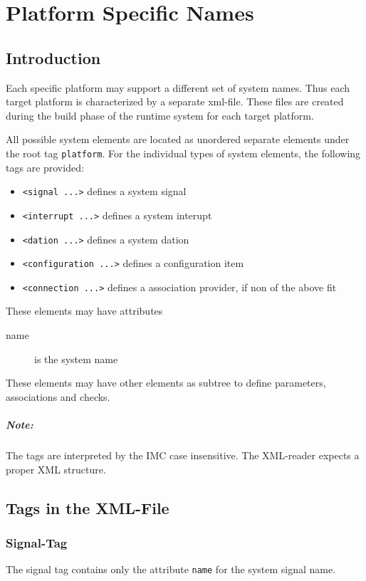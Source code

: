 \chapter{Platform Specific Names}

\section{Introduction}
Each specific platform may support a different set of system names.
Thus each target platform is characterized by a separate xml-file.
These files are created during the build phase of the runtime system
for each target platform.

All possible system elements are located as unordered separate 
elements under the root tag \verb|platform|.
For the individual types of system elements, the following tags are
provided:
\begin{itemize}
\item \verb|<signal ...>| defines a system signal
\item \verb|<interrupt ...>| defines a system interupt
\item \verb|<dation ...>| defines a system dation
\item \verb|<configuration ...>| defines a configuration item
\item \verb|<connection ...>| defines a association provider, if 
   non of the above fit
\end{itemize}

These elements may have attributes 
\begin{description}
\item [name] is the system name
\end{description}

These elements may have other elements as subtree to define parameters, associations and checks.

\paragraph{Note:} The tags are interpreted by the IMC case insensitive. The XML-reader 
expects a  proper XML structure.

\section{Tags in the XML-File}
\subsection{Signal-Tag}
The signal tag contains only the attribute \verb|name| for the
system signal name.

